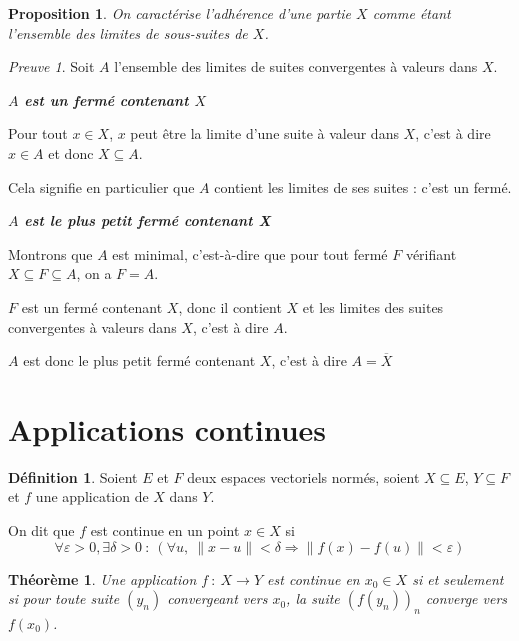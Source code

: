 \documentclass[]{article}
\newtheorem{mythm}{Théorème}
\newtheorem{myproposition}{Proposition}
\theoremstyle{remark}
\newtheorem{myproof}{Preuve}
\theoremstyle{definition}
\newtheorem{mydef}{Définition}
\newenvironment{proofpart}[1]{
	\leavevmode
	
	\noindent
	{\textit{\textbf{\boldmath #1}}}
	
}{
	\checkmark
}
\begin{document}
\begin{myproposition}
	On caractérise l'adhérence d'une partie $X$ comme étant l'ensemble des limites de sous-suites de $X$.
\end{myproposition}

\begin{myproof}
	Soit $A$ l'ensemble des limites de suites convergentes à valeurs dans $X$.
	
	
	\begin{proofpart}{$A$ est un fermé contenant $X$}
		Pour tout $x \in X$, $x$ peut être la limite d'une suite à valeur dans $X$, c'est à dire $x \in A$ et donc $X \subseteq A$.
		
		Cela signifie en particulier que $A$ contient les limites de ses suites : c'est un fermé.
	\end{proofpart}
	
	\begin{proofpart}{$A$ est le plus petit fermé contenant X}
	
	Montrons que $A$ est minimal, c'est-à-dire que pour tout fermé $F$ vérifiant $X \subseteq F \subseteq A$, on a $F=A$.
	
	$F$ est un fermé contenant $X$, donc il contient $X$ et les limites des suites convergentes à valeurs dans $X$, c'est à dire $A$.
	\end{proofpart}
	
	$A$ est donc le plus petit fermé contenant $X$, c'est à dire $A = \overline{X}$	
\end{myproof}

\section{Applications continues}

\begin{mydef}
	Soient $E$ et $F$ deux espaces vectoriels normés, soient $X \subseteq E$, $Y \subseteq F$ et $f$ une application de $X$ dans $Y$.
	
	On dit que $f$ est continue en un point $x \in X$ si $$\forall \varepsilon > 0, \exists \delta > 0 ~ : ~ (\forall u, ~ \|x-u\| < \delta \Longrightarrow \|f(x)-f(u)\| < \varepsilon)$$
\end{mydef}

\begin{mythm}
	Une application $f~:~X \longrightarrow Y$ est continue en $x_0 \in X$ si et seulement si pour toute suite $(y_n)$ convergeant vers $x_0$, la suite $\left(f(y_n)\right)_n$ converge vers $f(x_0)$.
\end{mythm}
\end{document}
